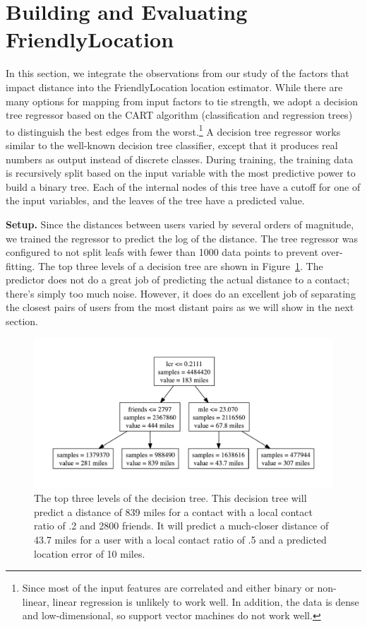 \documentclass[letterpaper]{article}
\begin{document}
\section{Building and Evaluating FriendlyLocation}

In this section, we integrate the observations from our study of the factors that impact distance into the FriendlyLocation location estimator.
%
While there are many options for mapping from input factors to tie strength, we adopt a decision tree regressor based on the CART algorithm (classification and regression trees) to distinguish the best edges from the worst.\footnote{Since most of the input features are correlated and either binary or non-linear,
linear regression is unlikely to work well. In addition, the data is dense and low-dimensional, so support vector machines
do not work well.} A decision tree regressor works similar to the well-known decision tree classifier, except that it produces real numbers as output instead of discrete classes. During training, the training data is recursively split based on the input
variable with the most predictive power to build a binary tree.  Each of the internal nodes of this tree have a cutoff for one of the input
variables, and the leaves of the tree have a predicted value.


\noindent\textbf{Setup.} Since the distances between users varied by several orders of magnitude, we
trained the regressor to predict the log of the distance.
%
The tree regressor was configured to not split leafs with fewer than 1000 data
points to prevent over-fitting.
%
The top three levels of a decision tree are shown in Figure~\ref{fig:TreeTop}.
%
The predictor does not do a great job of predicting the actual distance to a
contact; there's simply too much noise.
%
However, it does do an excellent job of separating the closest pairs of users
from the most distant pairs as we will show in the next section.

\begin{figure}[tbh]
\centering
\includegraphics[width=.9\linewidth]{figures/tree_top.pdf}
\caption{
    The top three levels of the decision tree. This decision tree will predict a
    distance of 839 miles for a contact with a local contact ratio of .2 and
    2800 friends. It will predict a much-closer distance of 43.7 miles for a
    user with a local contact ratio of .5 and a predicted location error of 10
    miles.
}
\label{fig:TreeTop}
\end{figure}
\end{document}
